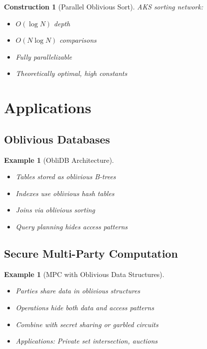 \documentclass[11pt,final,hidelinks]{article}
\newtheorem{example}[theorem]{Example}
\newtheorem{construction}[theorem]{Construction}
\begin{document}
\begin{construction}[Parallel Oblivious Sort]
AKS sorting network:
\begin{itemize}
    \item $O(\log N)$ depth
    \item $O(N \log N)$ comparisons
    \item Fully parallelizable
    \item Theoretically optimal, high constants
\end{itemize}
\end{construction}

\section{Applications}

\subsection{Oblivious Databases}

\begin{example}[ObliDB Architecture]
\begin{itemize}
    \item Tables stored as oblivious B-trees
    \item Indexes use oblivious hash tables
    \item Joins via oblivious sorting
    \item Query planning hides access patterns
\end{itemize}
\end{example}

\subsection{Secure Multi-Party Computation}

\begin{example}[MPC with Oblivious Data Structures]
\begin{itemize}
    \item Parties share data in oblivious structures
    \item Operations hide both data and access patterns
    \item Combine with secret sharing or garbled circuits
    \item Applications: Private set intersection, auctions
\end{itemize}
\end{example}
\end{document}
